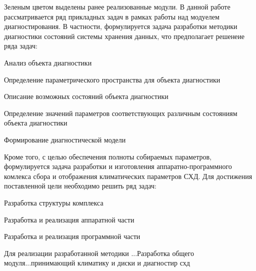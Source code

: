 Зеленым цветом выделены ранее реализованные модули.
В данной работе рассматривается ряд прикладных задач в рамках работы над модуелем диагностирования. В частности, формулируется задача разработки методики диагностики состояний системы хранения данных, что предполагает решенеие ряда задач:
\begin{itemize*}
	\item{Анализ объекта диагностики}
	\item{Определение параметрического пространства для объекта диагностики}
	\item{Описание возможных состояний объекта диагностики}
	\item{Определение значений параметров соответствующих различным состояниям объекта диагностики}
	\item{Формирование диагностической модели}
\end{itemize*}
Кроме того, с целью обеспечения полноты собираемых параметров, формулируется задача разработки и изготовления аппаратно-программного комлекса сбора и отображения климатических параметров СХД. Для достижения поставленной цели необходимо решить ряд задач: 
\begin{itemize*}
	\item{Разработка структуры комплекса}
	\item{Разработка и реализация аппаратной части}
	\item{Разработка и реализация программной части}
\end{itemize*}	 
Для реализации разработанной методики ...Разработка общего модуля...принимающий климатику и диски и диагностир схд 

